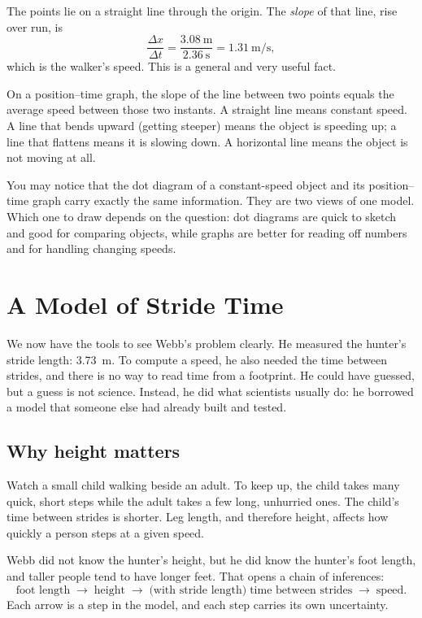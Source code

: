 \documentclass[11pt,twoside,openany]{book}
\begin{document}
The points lie on a straight line through the origin. The \emph{slope} of that line, rise over run, is
\[
\frac{\Delta x}{\Delta t} = \frac{\SI{3.08}{\metre}}{\SI{2.36}{\second}} = \SI{1.31}{\metre\per\second},
\]
which is the walker's speed. This is a general and very useful fact.

\begin{keyidea}
On a position--time graph, the slope of the line between two points equals the average speed between those two instants. A straight line means constant speed. A line that bends upward (getting steeper) means the object is speeding up; a line that flattens means it is slowing down. A horizontal line means the object is not moving at all.
\end{keyidea}

You may notice that the dot diagram of a constant-speed object and its position--time graph carry exactly the same information. They are two views of one model. Which one to draw depends on the question: dot diagrams are quick to sketch and good for comparing objects, while graphs are better for reading off numbers and for handling changing speeds.

\section{A Model of Stride Time}
\label{sec:stridemodel}

We now have the tools to see Webb's problem clearly. He measured the hunter's stride length: \SI{3.73}{\metre}. To compute a speed, he also needed the time between strides, and there is no way to read time from a footprint. He could have guessed, but a guess is not science. Instead, he did what scientists usually do: he borrowed a model that someone else had already built and tested.

\subsection{Why height matters}

Watch a small child walking beside an adult. To keep up, the child takes many quick, short steps while the adult takes a few long, unhurried ones. The child's time between strides is shorter. Leg length, and therefore height, affects how quickly a person steps at a given speed.

Webb did not know the hunter's height, but he did know the hunter's foot length, and taller people tend to have longer feet. That opens a chain of inferences:
\[
\text{foot length} \;\longrightarrow\; \text{height} \;\longrightarrow\; \text{(with stride length)}\;\text{time between strides} \;\longrightarrow\; \text{speed}.
\]
Each arrow is a step in the model, and each step carries its own uncertainty.
\end{document}
